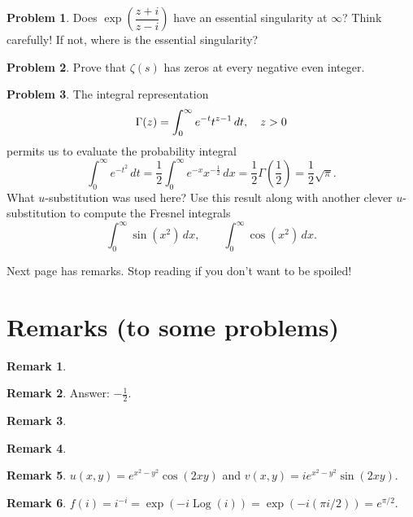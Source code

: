 \documentclass[11pt,oneside]{amsart}
\theoremstyle{definition}
\newtheorem{problem}{Problem}
\newtheorem{remark}{Remark}
\let\Re\relax
\DeclareMathOperator{\Re}{Re}
\DeclareMathOperator{\Log}{Log}
\begin{document}
\begin{problem}
  Does $\exp\left(\dfrac{z+i}{z-i}\right)$ have an essential singularity at $\infty$? Think carefully! If not, where is the essential singularity?
\end{problem}

\begin{problem}
  Prove that $\zeta(s)$ has zeros at every negative even integer.
\end{problem}

\begin{problem}
  The integral representation
  \[\Gamma(z)=\int_0^\infty e^{-t}t^{z-1}\,dt,\quad \Re z>0\]
  permits us to evaluate the probability integral
  \[\int_0^\infty e^{-t^2}\,dt=\frac 12\int_0^\infty e^{-x}x^{-\frac12}\,dx=\frac 12\Gamma\left(\frac12\right)=\frac 12\sqrt{\pi}.\]
  What $u$-substitution was used here? Use this result along with another clever $u$-substitution to compute the Fresnel integrals
  \[\int_0^\infty\sin(x^2)\,dx,\qquad\int_0^\infty\cos(x^2)\,dx.\]
\end{problem}

\vfill

Next page has remarks. Stop reading if you don't want to be spoiled!

\newpage

\section{Remarks (to some problems)}

\begin{remark} %
  
\end{remark}

\begin{remark} %
  Answer: $-\frac12$.
\end{remark}

\begin{remark} %
\end{remark}

\begin{remark} %
\end{remark}

\begin{remark} %
  $u(x,y)=e^{x^2-y^2}\cos(2xy)$ and $v(x,y)=ie^{x^2-y^2}\sin(2xy)$.
\end{remark}

\begin{remark} %
  $f(i)=i^{-i}=\exp(-i\Log(i))=\exp(-i(\pi i/2))=e^{\pi/2}$.
\end{remark}
\end{document}
